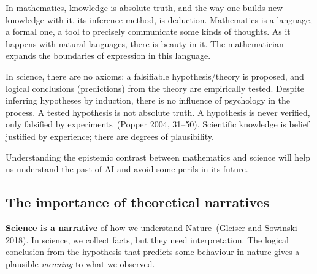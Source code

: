 \documentclass[
  a4paperpaper,
  a4paper,
  12pt,
  twoside,
  brazil,
  british,
  open=right]{scrbook}
\begin{document}
In mathematics, knowledge is absolute truth, and the way one builds new
knowledge with it, its inference method, is deduction. Mathematics is a
language, a formal one, a tool to precisely communicate some kinds of
thoughts. As it happens with natural languages, there is beauty in it.
The mathematician expands the boundaries of expression in this language.

In science, there are no axioms: a falsifiable hypothesis/theory is
proposed, and logical conclusions (predictions) from the theory are
empirically tested. Despite inferring hypotheses by induction, there is
no influence of psychology in the process. A tested hypothesis is not
absolute truth. A hypothesis is never verified, only falsified by
experiments~(Popper 2004,
31--50).
Scientific knowledge is belief justified by experience; there are
degrees of plausibility.

Understanding the epistemic contrast between mathematics and science
will help us understand the past of {AI} and avoid some perils in its
future.

\hypertarget{the-importance-of-theoretical-narratives}{%
\subsection{The importance of theoretical
narratives}\label{the-importance-of-theoretical-narratives}}

\textbf{Science is a narrative} of how we understand Nature~(Gleiser and
Sowinski
2018).
In science, we collect facts, but they need interpretation. The logical
conclusion from the hypothesis that predicts some behaviour in nature
gives a plausible \emph{meaning} to what we observed.
\end{document}
